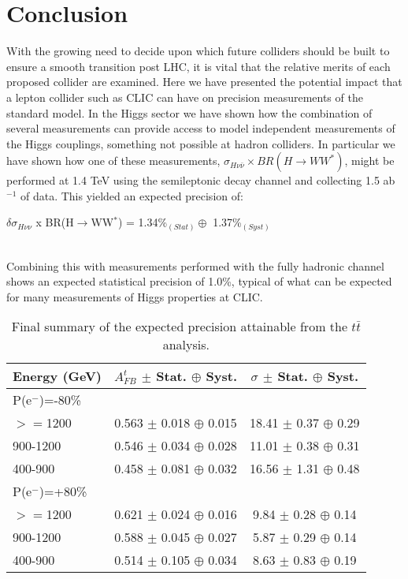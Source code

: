 \chapter{Conclusion}

With the growing need to decide upon which future colliders should be built to ensure a smooth transition post LHC, it is vital that the relative merits of each proposed collider are examined. Here we have presented the potential impact that a lepton collider such as \ac{CLIC} can have on precision measurements of the standard model. In the Higgs sector we have shown how the combination of several measurements can provide access to model independent measurements of the Higgs couplings, something not possible at hadron colliders. In particular we have shown how one of these measurements, $\sigma_{H\nu\bar{\nu}} \times BR(H\rightarrow WW^*)$, might be performed at 1.4 TeV using the semileptonic decay channel and collecting 1.5 ab$^{-1}$ of data. This yielded an expected precision of: \\[10pt]\centerline{\large{$\delta\sigma_{H\nu\nu}$ x BR(H$\rightarrow$WW$^*$) = 1.34\%$_{(Stat)} \oplus$ 1.37\%$_{(Syst)}$}} \\[10pt] Combining this with measurements performed with the fully hadronic channel shows an expected statistical precision of 1.0\%, typical of what can be expected for many measurements of Higgs properties at \ac{CLIC}.

\begin{table}[t]
  \centering
  \begin{tabular}{l|c|c}
    \toprule
    Energy (GeV) & $A_{FB}^t$ $\pm$ Stat. $\oplus$ Syst. & $\sigma$  $\pm$ Stat. $\oplus$ Syst.   \\
    \midrule
    \midrule
    \multicolumn{3}{l}{ P(e$^-$)=-80\%}\\
    \midrule
    $>=$1200   & 0.563 $\pm$ 0.018 $\oplus$ 0.015 & 18.41 $\pm$ 0.37 $\oplus$ 0.29\\
    \midrule
    900-1200   & 0.546 $\pm$ 0.034 $\oplus$ 0.028 & 11.01 $\pm$ 0.38 $\oplus$ 0.31\\
    \midrule
    400-900    & 0.458 $\pm$ 0.081 $\oplus$ 0.032 & 16.56 $\pm$ 1.31 $\oplus$ 0.48\\
    \midrule
    \midrule
    \multicolumn{3}{l}{ P(e$^-$)=+80\%}\\
    \midrule
    $>=$1200  & 0.621 $\pm$ 0.024 $\oplus$ 0.016 & 9.84 $\pm$ 0.28 $\oplus$ 0.14\\
    \midrule
    900-1200  & 0.588 $\pm$ 0.045 $\oplus$ 0.027 & 5.87 $\pm$ 0.29 $\oplus$ 0.14\\
    \midrule
    400-900   & 0.514 $\pm$ 0.105 $\oplus$ 0.034 & 8.63 $\pm$ 0.83 $\oplus$ 0.19\\
    \bottomrule
  \end{tabular}
  \caption{Final summary of the expected precision attainable from the $t\bar{t}$ analysis.}
  \label{conlusiontable}
\end{table}

